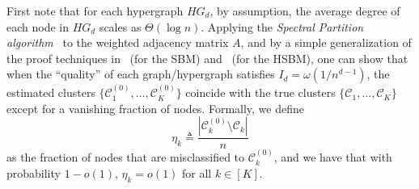 \documentclass{article}
\begin{document}
First note that for each hypergraph $HG_d$, by assumption, the average degree of each node in $HG_d$ scales as $\Theta(\log n)$. Applying the \emph{Spectral Partition algorithm}~\cite{yun2016optimal}  to the weighted adjacency matrix $A$, and by a simple generalization of the proof techniques in~\cite{yun2016optimal} (for the SBM) and~\cite{zhang2022exact} (for the HSBM), one can show that when the ``quality'' of each  graph/hypergraph satisfies $I_d  = \omega(1/n^{d-1})$, the estimated clusters $\{ \mathcal{C}_1^{(0)}, \ldots, \mathcal{C}_K^{(0)} \}$ coincide with the true clusters $\{ \mathcal{C}_1, \ldots, \mathcal{C}_K \}$ except for a vanishing fraction of nodes. Formally, we define  $$\eta_k \triangleq \frac{|\mathcal{C}_k^{(0)} \setminus \mathcal{C}_k|}{n}$$ 
as the fraction of nodes that are misclassified to $\mathcal{C}_k^{(0)}$, and we have that with probability $1- o(1)$, $\eta_k = o(1)$ for all $k \in [K]$.   


\end{document}
